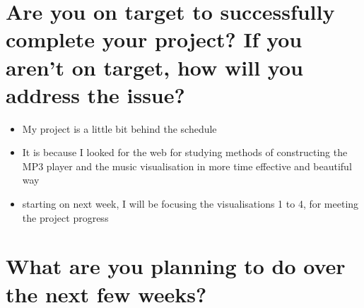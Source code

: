 \section*{Are you on target to successfully complete your project? If you aren’t on target, how will you address the issue?}

\begin{itemize}
  \item My project is a little bit behind the schedule
  \item It is because I looked for the web for studying methods of constructing the MP3 player and the music visualisation in more time effective and beautiful way
  \item starting on next week, I will be focusing the visualisations 1 to 4, for meeting the project progress
\end{itemize}

\section*{What are you planning to do over the next few weeks?}

